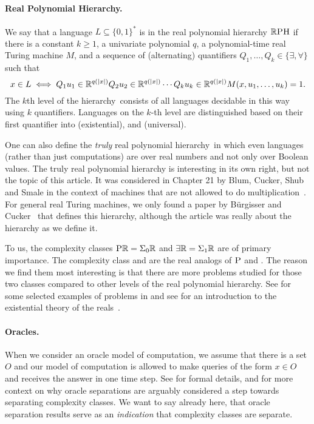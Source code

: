 \documentclass{article}
\begin{document}
    \paragraph{Real Polynomial Hierarchy.}
        We say that a language $L \subseteq \{0,1\}^*$ is in the real polynomial hierarchy $\RPH$ 
        if there is a constant $k\geq 1$, a univariate polynomial $q$, a polynomial-time real Turing machine $M$, and a sequence of (alternating) quantifiers $Q_1, \dotsc, Q_k \in \{\exists, \forall\}$ such that
        \begin{equation*}
        x \in L \iff Q_1 u_1 \in \R^{q(|x|)} Q_2 u_2 \in \R^{q(|x|)} \cdots Q_k u_k \in \R^{q(|x|)} M(x, u_1,\ldots,u_k)=1.
        \end{equation*}
        The $k$th level of the hierarchy~\RPH consists of all languages decidable in this way using \(k\) quantifiers.
        Languages on the \(k\)-th level are distinguished based on their first quantifier into  (existential), and  (universal).
    
        One can also define the \emph{truly} real polynomial hierarchy~\TrulyRPH in which even languages (rather than just computations) are over real numbers and not only over Boolean values.
        The truly real polynomial hierarchy is interesting in its own right, but not the topic of this article.
        It was considered in Chapter 21 by Blum, Cucker, Shub and Smale in the context of machines that are not allowed to do multiplication~\cite[Chapter 21]{BCSS98}.
        For general real Turing machines, we only found a paper by B\"{u}rgisser and Cucker~\cite{BC09} that defines this hierarchy, although the article was really about the hierarchy as we define it.
     
        To us, the complexity classes $\PR = \SRPHlevel{0}$ and $\ER = \SRPHlevel{1}$ are of primary importance. 
        The complexity class \PR and \ER are the real analogs of $\P$ and \NP. 
        The reason we find them most interesting is that 
        there are more problems studied for those two classes compared to other levels of the real polynomial hierarchy.
        See  for some selected examples of problems in \PR and
        see  for an introduction to the existential theory of the reals~\ER.
         
    \paragraph{Oracles.}
        When we consider an oracle model of computation, we assume that there is a set $O$ and our model of computation is allowed to make queries of the form $x\in O$ and receives the answer in one time step.    
        See  for formal details, and  for more context on why oracle separations are arguably considered a step towards separating complexity classes.
        We want to say already here, that oracle separation results serve as an \textit{indication} that complexity classes are separate.
        
\end{document}
